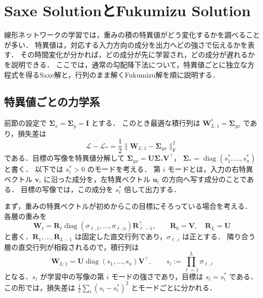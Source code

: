 \documentclass[../main.tex]{subfiles}
\begin{document}
\section{Saxe SolutionとFukumizu Solution}
\label{sec:linear-exact-solutions}

線形ネットワークの学習では，重みの積の特異値がどう変化するかを調べることが多い．
特異値は，対応する入力方向の成分を出力へどの強さで伝えるかを表す．
その時間変化が分かれば，どの成分が先に学習され，どの成分が遅れるかを説明できる．
ここでは，通常の勾配降下法について，特異値ごとに独立な方程式を得るSaxe解と，行列のまま解くFukumizu解を順に説明する．

\subsection{特異値ごとの力学系}

前節の設定で $\bm{\Sigma}_x=\bm{\Sigma}_y=\bm{I}$ とする．
このとき最適な積行列は $\bm{W}_{L:1}^*=\bm{\Sigma}_{yx}$ であり，損失差は
\begin{equation}
  \mathcal{L}-\mathcal{L}_*
  =\frac12\|\bm{W}_{L:1}-\bm{\Sigma}_{yx}\|_{\mathrm F}^2
  \label{eq:linear-whitened-loss}
\end{equation}
である．目標の写像を特異値分解して
$\bm{\Sigma}_{yx}=\bm{U}\bm{\Sigma}_*\bm{V}^\top$，
$\bm{\Sigma}_*=\operatorname{diag}(s_1^*,\ldots,s_n^*)$ と書く．
以下では $s_i^*>0$ のモードを考える．
第 $i$ モードとは，入力の右特異ベクトル $\bm{v}_i$ に沿った成分を，左特異ベクトル $\bm{u}_i$ の方向へ写す成分のことである．
目標の写像では，この成分を $s_i^*$ 倍して出力する．

まず，重みの特異ベクトルが初めからこの目標にそろっている場合を考える．
各層の重みを
\begin{equation}
  \bm{W}_\ell
  =\bm{R}_\ell\operatorname{diag}(\sigma_{\ell,1},\ldots,\sigma_{\ell,n})
  \bm{R}_{\ell-1}^\top,
  \qquad \bm{R}_0=\bm{V},\quad\bm{R}_L=\bm{U}
  \label{eq:linear-aligned-weights}
\end{equation}
と書く．$\bm{R}_1,\ldots,\bm{R}_{L-1}$ は固定した直交行列であり，$\sigma_{\ell,i}$ は正とする．
隣り合う層の直交行列が相殺されるので，積行列は
\begin{equation}
  \bm{W}_{L:1}
  =\bm{U}\operatorname{diag}(s_1,\ldots,s_n)\bm{V}^\top,
  \qquad s_i:=\prod_{\ell=1}^L \sigma_{\ell,i}
  \label{eq:linear-mode-products}
\end{equation}
となる．$s_i$ が学習中の写像の第 $i$ モードの強さであり，目標は $s_i=s_i^*$ である．
この形では，損失差は $\frac12\sum_i(s_i-s_i^*)^2$ とモードごとに分かれる．
\end{document}
